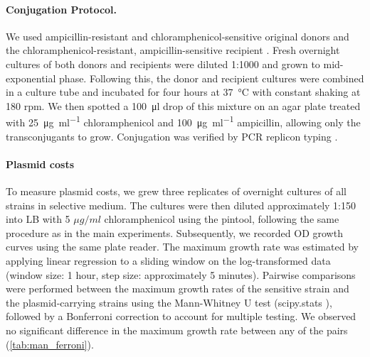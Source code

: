 \paragraph{Conjugation Protocol.\label{par: conj_protocol}}
We used ampicillin-resistant and chloramphenicol-sensitive original donors \cite{Sutter2016, Huisman2022Conjugation} and the chloramphenicol-resistant, ampicillin-sensitive recipient \cite{Feher2012}. 
Fresh overnight cultures of both donors and recipients were diluted 1:1000 and grown to mid-exponential phase. 
Following this, the donor and recipient cultures were combined in a culture tube and incubated for four hours at \SI{37}{\celsius} with constant shaking at 180 rpm.
We then spotted a \SI{100}{\micro \litre} drop of this mixture on an agar plate treated with \SI{25}{\micro \gram \per \milli \litre} chloramphenicol and \SI{100}{\micro \gram \per \milli \litre} ampicillin, allowing only the transconjugants to grow. 
Conjugation was verified by PCR replicon typing \cite{Carattoli2005}. 

\paragraph{Plasmid costs}
To measure plasmid costs, we grew three replicates of overnight cultures of all strains in selective medium. 
The cultures were then diluted approximately 1:150 into LB with 5 $\mu g/ml$ chloramphenicol using the pintool, following the same procedure as in the main experiments. 
Subsequently, we recorded OD growth curves using the same plate reader. 
The maximum growth rate was estimated by applying linear regression to a sliding window on the log-transformed data (window size: 1 hour, step size: approximately 5 minutes). 
Pairwise comparisons were performed between the maximum growth rates of the sensitive strain and the plasmid-carrying strains using the Mann-Whitney U test (scipy.stats \cite{Virtanen2020}), followed by a Bonferroni correction to account for multiple testing.
We observed no significant difference in the maximum growth rate between any of the pairs (\autoref{tab:man_ferroni}).


